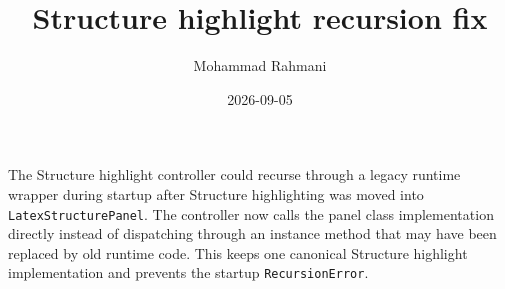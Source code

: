 \documentclass[a4paper]{article}
\title{Structure highlight recursion fix}
\date{2026-09-05}
\author{Mohammad Rahmani}
\begin{document}
   \maketitle

   The Structure highlight controller could recurse through a legacy runtime wrapper during startup after Structure highlighting was moved into \texttt{LatexStructurePanel}. The controller now calls the panel class implementation directly instead of dispatching through an instance method that may have been replaced by old runtime code. This keeps one canonical Structure highlight implementation and prevents the startup \texttt{RecursionError}.

   
   
\end{document}
